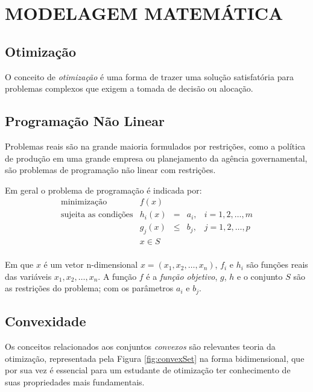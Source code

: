 
\chapter{MODELAGEM MATEMÁTICA}
\label{chap:modelagem_matematica}

\section{Otimização}

O conceito de \textit{otimização} é uma forma de trazer uma solução satisfatória para problemas complexos que exigem a tomada de decisão ou alocação. \cite{Luenberger2016}

\section{Programação Não Linear}

Problemas reais são na grande maioria formulados por restrições, como a política de produção em uma grande empresa ou planejamento da agência governamental, são problemas de programação não linear com restrições.

Em geral o problema de programação é indicada por:
\begin{equation}
\begin{array}{rcccc}
\mbox{minimização} & f(x) & & & \\
\mbox{sujeita as condições} & h_{i}(x)&=&a_{i}, & i=1,2,\ldots,m \\
& g_ {j}(x)&\leq&b_j, & j=1,2,\ldots,p\\
& x\in S & & & \\
\end{array}
\end{equation}

Em que $x$ é um vetor n-dimensional $x=(x_{1},x_{2},\ldots,x_{n})$, $f_{i}$ e $h_i$ são funções reais das variáveis $x_{1},x_{2},\ldots,x_{n}$. A função $f$ é a \textit{função objetivo}, $g$, $h$ e o conjunto $S$ são as restrições do problema; com os parâmetros $a_i$ e $b_j$. \cite{Luenberger2016, Rocha2009a}

\section{Convexidade}

Os conceitos relacionados aos conjuntos \textit{convexos} são relevantes teoria da otimização, representada pela Figura \ref{fig:convexSet} na forma bidimensional, que por sua vez é essencial para um estudante de otimização ter conhecimento de suas propriedades mais fundamentais. \cite{Luenberger2016, Rocha2009a}

